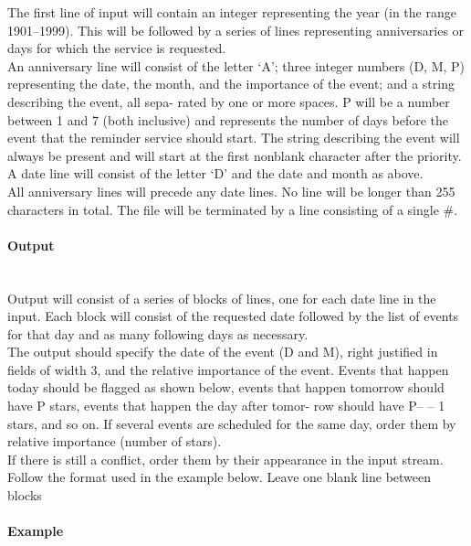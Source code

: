\documentclass{article}
\begin{document}
The first line of input will contain an integer representing the year (in the range 1901–1999).
This will be followed by a series of lines representing anniversaries or days for which the service is
requested.\\
An anniversary line will consist of the letter ‘A’; three integer numbers (D, M, P) representing
the date, the month, and the importance of the event; and a string describing the event, all sepa-
rated by one or more spaces. P will be a number between 1 and 7 (both inclusive) and represents
the number of days before the event that the reminder service should start. The string describing
the event will always be present and will start at the first nonblank character after the priority.
A date line will consist of the letter ‘D’ and the date and month as above.\\
All anniversary lines will precede any date lines. No line will be longer than 255 characters in
total. The file will be terminated by a line consisting of a single \#.

\paragraph{Output}\mbox{} \\
Output will consist of a series of blocks of lines, one for each date line in the input. Each block
will consist of the requested date followed by the list of events for that day and as many following
days as necessary.\\
The output should specify the date of the event (D and M), right justified in fields of width
3, and the relative importance of the event. Events that happen today should be flagged as shown
below, events that happen tomorrow should have P stars, events that happen the day after tomor-
row should have P– – 1 stars, and so on. If several events are scheduled for the same day, order
them by relative importance (number of stars).\\
If there is still a conflict, order them by their appearance in the input stream. Follow the format
used in the example below. Leave one blank line between blocks


\paragraph{Example}\mbox{} \\
\end{document}
